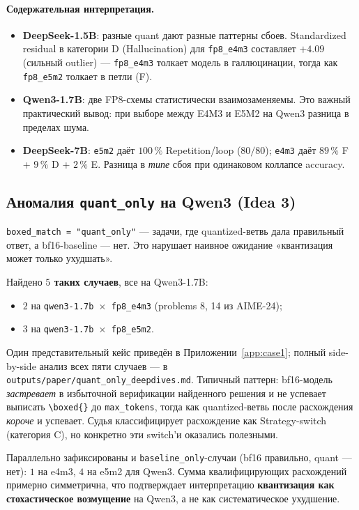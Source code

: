 \documentclass[11pt, a4paper]{article}
\newcommand{\code}[1]{\texttt{#1}}
\begin{document}
\paragraph{Содержательная интерпретация.}
\begin{itemize}[leftmargin=*]
\item \textbf{DeepSeek-1.5B}: разные quant дают разные паттерны сбоев.
Standardized residual в категории D (Hallucination) для
\code{fp8\_e4m3} составляет $+4.09$ (сильный outlier) — \code{fp8\_e4m3}
толкает модель в галлюцинации, тогда как \code{fp8\_e5m2} толкает в
петли (F).
\item \textbf{Qwen3-1.7B}: две FP8-схемы статистически взаимозаменяемы.
Это важный практический вывод: при выборе между E4M3 и E5M2 на Qwen3
разница в пределах шума.
\item \textbf{DeepSeek-7B}: \code{e5m2} даёт $100\,\%$ Repetition/loop
($80/80$); \code{e4m3} даёт $89\,\%$ F + $9\,\%$ D + $2\,\%$ E. Разница в
\emph{типе} сбоя при одинаковом коллапсе accuracy.
\end{itemize}

\subsection{Аномалия \code{quant\_only} на Qwen3 (Idea 3)}

\code{boxed\_match = "quant\_only"} — задачи, где quantized-ветвь дала
правильный ответ, а bf16-baseline — нет. Это нарушает наивное ожидание
«квантизация может только ухудшать».

Найдено \textbf{$5$ таких случаев}, все на Qwen3-1.7B:
\begin{itemize}[itemsep=0pt]
\item $2$ на \code{qwen3-1.7b $\times$ fp8\_e4m3} (problems 8, 14 из AIME-24);
\item $3$ на \code{qwen3-1.7b $\times$ fp8\_e5m2}.
\end{itemize}

Один представительный кейс приведён в Приложении~\ref{app:case1}; полный
side-by-side анализ всех пяти случаев — в \code{outputs/paper/quant\_only\_deepdives.md}.
Типичный паттерн: bf16-модель \emph{застревает} в избыточной верификации
найденного решения и не успевает выписать \code{\textbackslash{}boxed\{\}}
до \code{max\_tokens}, тогда как quantized-ветвь после расхождения
\emph{короче} и успевает. Судья классифицирует расхождение как
Strategy-switch (категория C), но конкретно эти switch'и оказались
полезными.

Параллельно зафиксированы и \code{baseline\_only}-случаи (bf16 правильно,
quant — нет): $1$ на e4m3, $4$ на e5m2 для Qwen3. Сумма квалифицирующих
расхождений примерно симметрична, что подтверждает интерпретацию
\textbf{квантизация как стохастическое возмущение} на Qwen3, а не как
систематическое ухудшение.
\end{document}
